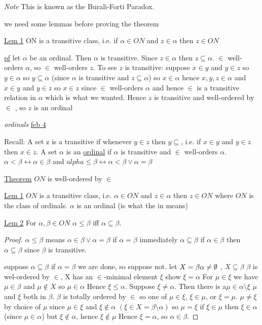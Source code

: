 \documentclass{article}
\begin{document}
    \emph{Note} This is known as the Burali-Forti Paradox.

    we need some lemmas before proving the theorem

    \underline{Lem 1} ON is a transitive class, i.e. if $\alpha \in ON$ and $z \in \alpha$ then $z \in ON$

    \underline{pf} let $\alpha$ be an ordinal.
    Then $\alpha$ is transitive.
    Since $z \in \alpha$ then $z \subseteq \alpha$.
    $\in$ well-orders $\alpha$, so $\in$ well-orders $z$.
    To see $z$ is transitive: suppose $x \in y$ and $y \in z$
    so $y \in \alpha$ so $y \subseteq \alpha$ (since $\alpha$ is transitive and $z \subseteq \alpha$)
    so $x \in \alpha$
    hence $x,y,z \in \alpha$ and $x \in y$ and $y \in z$ so $x \in z$
    since $\in$ well-orders $\alpha$ and hence $\in$ is a transitive relation in $\alpha$
    which is what we wanted.
    Hence $z$ is transitive and well-ordered by $\in$ , so $z$ is an ordinal

    \emph{ordinals} \underline{feb 4}

    Recall: A set z is a transitive if whenever $y \in z$ then $y \subseteq$, i.e. if $x \in y$ and $y \in z$ then $x \in z$.
    A set $\alpha$ is an \underline{ordinal} if $\alpha$ is transitive and $\in$ well-orders $\alpha$.
    $\alpha < \beta \leftrightarrow \alpha \in \beta$ and $alpha \leq \beta \leftrightarrow \alpha < \beta \vee \alpha = \beta$

    \underline{Theorem} $ON$ is well-ordered by $\in$

    \underline{Lem 1} $ON$ is a transitive class, i.e. $\alpha \in ON$ and $z \in \alpha$ then $z \in ON$ where $ON$ is the class of ordinals. $\alpha$ is an ordinal (is what the in means)

    \underline{Lem 2} For $\alpha , \beta \in ON$ $\alpha \leq \beta $ iff $\alpha \subseteq \beta$.
    \begin{proof}

    $\alpha \leq \beta$ means $\alpha \in \beta \vee \alpha = \beta$
    if $\alpha = \beta$ immediately $\alpha \subseteq \beta$
    if $\alpha \in \beta$ then $\alpha \subseteq \beta$ since $\beta$ is transitive.

    suppose $\alpha \subseteq \beta$
    if $\alpha = \beta$ we are done, so suppose not.
    let $X = \beta \\ \alpha \neq \emptyset$ , $X \subseteq \beta$
    $\beta$ is wel-ordered by $\in$,
    X has an $\in$-minimal element $\xi$
    show $\xi = \alpha$
    For $\mu \in \xi$ we have $\mu \in \beta$ and $\mu \notin X$ so $\mu \in \alpha$
    Hence $\xi \leq \alpha$.
    Suppose $\xi \neq \alpha$.
    Then there is a$\mu \in \alpha \setminus \xi$
    $\mu$ and $\xi$ both in $\beta$.
    $\beta$ is totally ordered by $\in$ so one of $\mu \in \xi$, $\xi \in \mu$, or $\xi = \mu$.
    $\mu \neq \xi$ by choice of $\mu$
    since $\mu \in \xi$ and $\xi \notin \alpha$ $(\xi \in X = \beta \setminus \alpha)$ so $\mu = \xi$
    if $\xi \in \mu$ then $\xi \in \alpha$ (since $\mu \in \alpha$) but $\xi \notin \alpha$, hence $\xi \notin \mu$
    Hence $\xi = \alpha$, so $\alpha \in \beta$.
    \end{proof}
\end{document}
